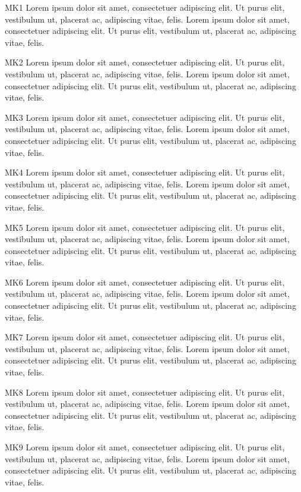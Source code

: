 \documentclass[twocolumn]{article}
\begin{document}
MK1 Lorem ipsum dolor sit amet, consectetuer adipiscing elit. Ut purus elit, vestibulum ut, placerat ac, adipiscing vitae, felis. Lorem ipsum dolor sit amet, consectetuer adipiscing elit. Ut purus elit, vestibulum ut, placerat ac, adipiscing vitae, felis.\par
{}MK2 Lorem ipsum dolor sit amet, consectetuer adipiscing elit. Ut purus elit, vestibulum ut, placerat ac, adipiscing vitae, felis. Lorem ipsum dolor sit amet, consectetuer adipiscing elit. Ut purus elit, vestibulum ut, placerat ac, adipiscing vitae, felis.\par
{}MK3 Lorem ipsum dolor sit amet, consectetuer adipiscing elit. Ut purus elit, vestibulum ut, placerat ac, adipiscing vitae, felis. Lorem ipsum dolor sit amet, consectetuer adipiscing elit. Ut purus elit, vestibulum ut, placerat ac, adipiscing vitae, felis.\par
{}MK4 Lorem ipsum dolor sit amet, consectetuer adipiscing elit. Ut purus elit, vestibulum ut, placerat ac, adipiscing vitae, felis. Lorem ipsum dolor sit amet, consectetuer adipiscing elit. Ut purus elit, vestibulum ut, placerat ac, adipiscing vitae, felis.\par
{}MK5 Lorem ipsum dolor sit amet, consectetuer adipiscing elit. Ut purus elit, vestibulum ut, placerat ac, adipiscing vitae, felis. Lorem ipsum dolor sit amet, consectetuer adipiscing elit. Ut purus elit, vestibulum ut, placerat ac, adipiscing vitae, felis.\par
{}
MK6 Lorem ipsum dolor sit amet, consectetuer adipiscing elit. Ut purus elit, vestibulum ut, placerat ac, adipiscing vitae, felis. Lorem ipsum dolor sit amet, consectetuer adipiscing elit. Ut purus elit, vestibulum ut, placerat ac, adipiscing vitae, felis.\par
{}MK7 Lorem ipsum dolor sit amet, consectetuer adipiscing elit. Ut purus elit, vestibulum ut, placerat ac, adipiscing vitae, felis. Lorem ipsum dolor sit amet, consectetuer adipiscing elit. Ut purus elit, vestibulum ut, placerat ac, adipiscing vitae, felis.\par
{}MK8 Lorem ipsum dolor sit amet, consectetuer adipiscing elit. Ut purus elit, vestibulum ut, placerat ac, adipiscing vitae, felis. Lorem ipsum dolor sit amet, consectetuer adipiscing elit. Ut purus elit, vestibulum ut, placerat ac, adipiscing vitae, felis.\par
{}MK9 Lorem ipsum dolor sit amet, consectetuer adipiscing elit. Ut purus elit, vestibulum ut, placerat ac, adipiscing vitae, felis. Lorem ipsum dolor sit amet, consectetuer adipiscing elit. Ut purus elit, vestibulum ut, placerat ac, adipiscing vitae, felis.\par
\end{document}
